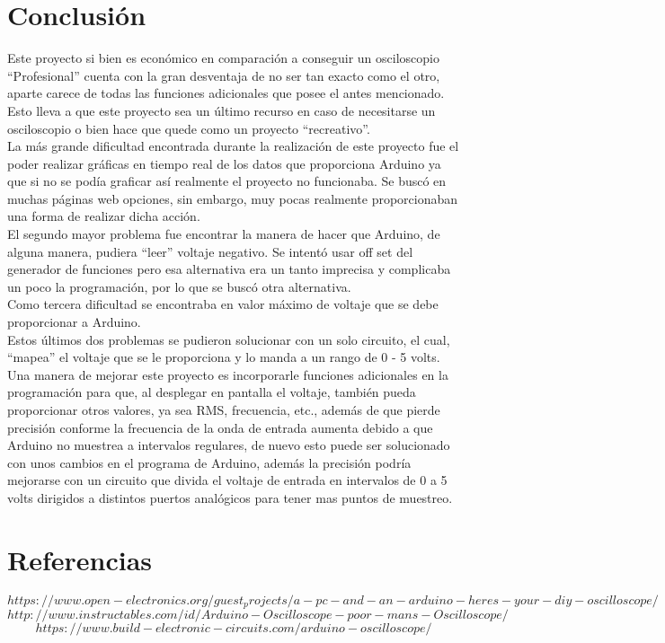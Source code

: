 \documentclass{article}
\begin{document}
\section{Conclusión}
Este proyecto si bien es económico en comparación a conseguir un osciloscopio
“Profesional” cuenta con la gran desventaja de no ser tan exacto como el otro, aparte
carece de todas las funciones adicionales que posee el antes mencionado. Esto lleva a que
este proyecto sea un último recurso en caso de necesitarse un osciloscopio o bien hace que
quede como un proyecto “recreativo”.\\
La más grande dificultad encontrada durante la realización de este proyecto fue el poder
realizar gráficas en tiempo real de los datos que proporciona Arduino ya que si no se
podía graficar así realmente el proyecto no funcionaba. Se buscó en muchas páginas web
opciones, sin embargo, muy pocas realmente proporcionaban una forma de realizar dicha
acción.\\
El segundo mayor problema fue encontrar la manera de hacer que Arduino, de alguna manera,
pudiera “leer” voltaje negativo. Se intentó usar off set del generador de funciones  pero
esa alternativa era un tanto imprecisa y complicaba un poco la programación, por lo que se
buscó otra alternativa.\\
Como tercera dificultad se encontraba en valor máximo de voltaje que se debe proporcionar
a Arduino.\\
Estos últimos dos problemas se pudieron solucionar con un solo circuito, el cual, “mapea”
el voltaje que se le proporciona y lo manda a un rango de 0 - 5 volts.\\
Una manera de mejorar este proyecto es incorporarle funciones adicionales en la
programación para que, al desplegar en pantalla el voltaje, también pueda proporcionar
otros valores, ya sea RMS, frecuencia, etc., además de que pierde precisión conforme la
frecuencia de la onda de entrada aumenta debido a que Arduino no muestrea a intervalos
regulares, de nuevo esto puede ser solucionado con unos cambios en el programa de
Arduino, además la precisión podría mejorarse con un circuito que divida el voltaje de
entrada en intervalos de 0 a 5 volts dirigidos a distintos puertos analógicos para tener
mas puntos de muestreo.

\section{Referencias}
$$https://www.open-electronics.org/guest_projects/a-pc-and-an-arduino-heres-your-diy-oscilloscope/$$
$$http://www.instructables.com/id/Arduino-Oscilloscope-poor-mans-Oscilloscope/$$
$$https://www.build-electronic-circuits.com/arduino-oscilloscope/$$
\end{document}
